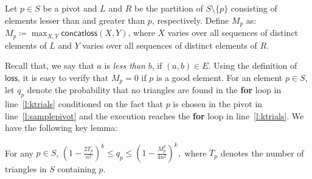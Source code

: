 \documentclass[11pt]{llncs}
\newcommand{\loss}{{\textsf{loss}}}
\newcommand{\conloss}{{\textsf{concatloss}}}
\begin{document}
\begin{definition}
    Let $p \in S$ be a pivot and $L$ and $R$ be the partition of $S \setminus \{p\}$ consisting of elements lesser than and greater than $p$, respectively. Define $M_p$ as: 
    $ M_p \coloneqq \max_{X, Y} \conloss(X,Y)$,
    where $X$ varies over all sequences of distinct elements of $L$ and $Y$ varies over all sequences of distinct elements of $R$. 
\end{definition}
Recall that, we say that $a$ is {\it less than} $b$, if $(a, b) \in E$. Using the definition of $\loss$, it is easy to verify that $M_p=0$ if $p$ is a good element. 
For an element $p \in S$, let $q_p$ denote the probability that no triangles are found in the {\bf for} loop in line~\ref{l:ktrials} conditioned on the fact that $p$ is chosen in the pivot in line~\ref{l:samplepivot} and the execution reaches the {\bf for} loop in line~\ref{l:ktrials}. We have the following key lemma: 
\begin{lemma}
    \label{lem:qp}
    For any $p \in S$,  $\left( 1 - \frac{2T_p}{n^2} \right)^k \leq q_p \leq \left( 1 - \frac{M_p^2}{4n^2} \right)^k,$ where $T_p$ denotes the number of triangles in $S$ containing $p$.
\end{lemma}
\end{document}
